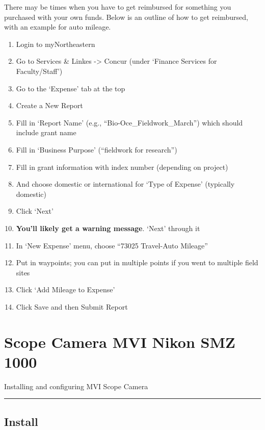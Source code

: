 \documentclass[
  letterpaper,
  DIV=11,
  numbers=noendperiod]{scrreprt}
\begin{document}

There may be times when you have to get reimbursed for something you
purchased with your own funds. Below is an outline of how to get
reimbursed, with an example for auto mileage.

\begin{enumerate}
\def\labelenumi{\arabic{enumi}.}
\item
  Login to myNortheastern
\item
  Go to Services \& Linkes -\textgreater{} Concur (under `Finance
  Services for Faculty/Staff')
\item
  Go to the `Expense' tab at the top
\item
  Create a New Report
\item
  Fill in `Report Name' (e.g., ``Bio-Oce\_Fieldwork\_March'') which
  should include grant name
\item
  Fill in `Business Purpose' (``fieldwork for research'')
\item
  Fill in grant information with index number (depending on project)
\item
  And choose domestic or international for `Type of Expense' (typically
  domestic)
\item
  Click `Next'
\item
  \textbf{You'll likely get a warning message}. `Next' through it
\item
  In `New Expense' menu, choose ``73025 Travel-Auto Mileage''
\item
  Put in waypoints; you can put in multiple points if you went to
  multiple field sites
\item
  Click `Add Mileage to Expense'
\item
  Click Save and then Submit Report
\end{enumerate}

\hypertarget{scope-camera-mvi-nikon-smz-1000}{%
\chapter{Scope Camera MVI Nikon SMZ
1000}\label{scope-camera-mvi-nikon-smz-1000}}

Installing and configuring MVI Scope Camera

\begin{center}\rule{0.5\linewidth}{0.5pt}\end{center}

\hypertarget{install}{%
\section*{\texorpdfstring{\textbf{Install}}{Install}}\label{install}}
\end{document}
